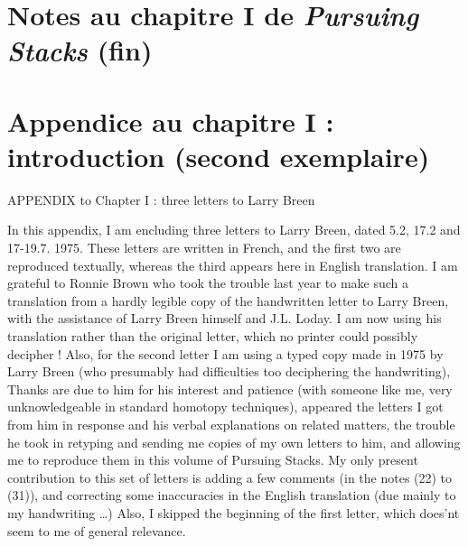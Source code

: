 \documentclass[11pt,a4paper]{article}
\begin{document}
\section{Notes au chapitre I de \emph{Pursuing Stacks} (fin)}


\section{Appendice au chapitre I : introduction (second exemplaire)}


APPENDIX to Chapter I : three letters to Larry Breen

In this appendix, I am encluding three letters to Larry Breen, dated
5.2, 17.2 and 17-19.7. 1975. These letters are written in French, and the
first two are reproduced textually, whereas the third appears here in English
translation. I am grateful to Ronnie Brown who took the trouble last year to
make such a translation from a hardly legible  copy of the
handwritten letter to Larry Breen, with the assistance of Larry Breen himself
and J.L. Loday. I am now using his translation rather than the original
letter, which no printer could possibly decipher ! Also, for the second letter
I am using a typed copy made in 1975 by Larry Breen (who presumably had
difficulties too deciphering the handwriting), Thanks are due to him for his
interest and patience (with someone like me, very unknowledgeable in standard
homotopy techniques),   appeared 
 the letters I got from him in response and his verbal explanations on
related matters,  the trouble he took in 
retyping  and sending me copies of my own letters to him, and
allowing me to reproduce them in this volume of Pursuing Stacks. My only
present contribution to this set of letters is adding a few comments (in the
notes (22) to (31)), and correcting some inaccuracies in the English
translation (due mainly to my handwriting …) Also, I skipped the beginning of
the first letter, which does'nt seem to me of general relevance.
\end{document}
